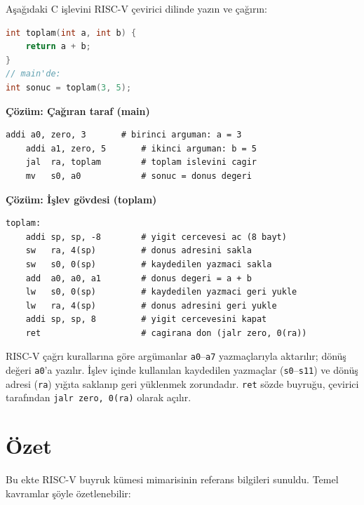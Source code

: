 \begin{ornek}[C.4]
\label{orn:ekc-altyordam}
Aşağıdaki C işlevini RISC-V çevirici dilinde yazın ve çağırın:
\begin{lstlisting}[language=C]
int toplam(int a, int b) {
    return a + b;
}
// main'de:
int sonuc = toplam(3, 5);
\end{lstlisting}

\textbf{Çözüm: Çağıran taraf (main)}
\begin{lstlisting}[style=riscv]
    addi a0, zero, 3       # birinci arguman: a = 3
    addi a1, zero, 5       # ikinci arguman: b = 5
    jal  ra, toplam        # toplam islevini cagir
    mv   s0, a0            # sonuc = donus degeri
\end{lstlisting}

\textbf{Çözüm: İşlev gövdesi (toplam)}
\begin{lstlisting}[style=riscv]
toplam:
    addi sp, sp, -8        # yigit cercevesi ac (8 bayt)
    sw   ra, 4(sp)         # donus adresini sakla
    sw   s0, 0(sp)         # kaydedilen yazmaci sakla
    add  a0, a0, a1        # donus degeri = a + b
    lw   s0, 0(sp)         # kaydedilen yazmaci geri yukle
    lw   ra, 4(sp)         # donus adresini geri yukle
    addi sp, sp, 8         # yigit cercevesini kapat
    ret                    # cagirana don (jalr zero, 0(ra))
\end{lstlisting}

RISC-V çağrı kurallarına göre argümanlar \texttt{a0}--\texttt{a7} yazmaçlarıyla aktarılır; dönüş değeri \texttt{a0}'a yazılır. İşlev içinde kullanılan kaydedilen yazmaçlar (\texttt{s0}--\texttt{s11}) ve dönüş adresi (\texttt{ra}) yığıta saklanıp geri yüklenmek zorundadır. \texttt{ret} sözde buyruğu, çevirici tarafından \texttt{jalr zero, 0(ra)} olarak açılır.
\end{ornek}

\section*{Özet}

Bu ekte RISC-V buyruk kümesi mimarisinin referans bilgileri sunuldu. Temel kavramlar şöyle özetlenebilir:

